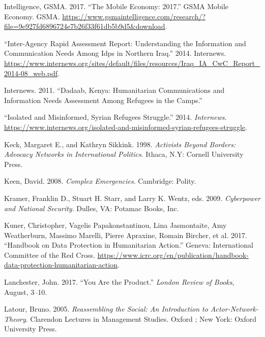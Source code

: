 \begin{cslreferences}
\leavevmode\hypertarget{ref-GSMAIntelligence2017Mobile}{}%
Intelligence, GSMA. 2017. ``The Mobile Economy: 2017.'' GSMA Mobile
Economy. GSMA.
\url{https://www.gsmaintelligence.com/research/?file=9e927fd6896724e7b26f33f61db5b9d5\&download}.

\leavevmode\hypertarget{ref-2014Inter-Agency}{}%
``Inter-Agency Rapid Assessment Report: Understanding the Information
and Communication Needs Among Idps in Northern Iraq.'' 2014. Internews.
\url{https://www.internews.org/sites/default/files/resources/Iraq_IA_CwC_Report_2014-08_web.pdf}.

\leavevmode\hypertarget{ref-Internews2011Dadaab}{}%
Internews. 2011. ``Dadaab, Kenya: Humanitarian Communications and
Information Needs Assessment Among Refugees in the Camps.''

\leavevmode\hypertarget{ref-2014Isolated}{}%
``Isolated and Misinformed, Syrian Refugees Struggle.'' 2014.
\emph{Internews}.
\url{https://www.internews.org/isolated-and-misinformed-syrian-refugees-struggle}.

\leavevmode\hypertarget{ref-Keck1998Activists}{}%
Keck, Margaret E., and Kathryn Sikkink. 1998. \emph{Activists Beyond
Borders: Advocacy Networks in International Politics}. Ithaca, N.Y:
Cornell University Press.

\leavevmode\hypertarget{ref-Keen2008Complex}{}%
Keen, David. 2008. \emph{Complex Emergencies}. Cambridge: Polity.

\leavevmode\hypertarget{ref-2009Cyberpower}{}%
Kramer, Franklin D., Stuart H. Starr, and Larry K. Wentz, eds. 2009.
\emph{Cyberpower and National Security}. Dulles, VA: Potamac Books, Inc.

\leavevmode\hypertarget{ref-Kuner2017Handbook}{}%
Kuner, Christopher, Vagelis Papakonstantinou, Lina Jasmontaite, Amy
Weatherburn, Massimo Marelli, Pierre Apraxine, Romain Bircher, et al.
2017. ``Handbook on Data Protection in Humanitarian Action.'' Geneva:
International Committee of the Red Cross.
\url{https://www.icrc.org/en/publication/handbook-data-protection-humanitarian-action}.

\leavevmode\hypertarget{ref-Lanchester2017You}{}%
Lanchester, John. 2017. ``You Are the Product.'' \emph{London Review of
Books}, August, 3--10.

\leavevmode\hypertarget{ref-Latour2005Reassembling}{}%
Latour, Bruno. 2005. \emph{Reassembling the Social: An Introduction to
Actor-Network-Theory}. Clarendon Lectures in Management Studies. Oxford
; New York: Oxford University Press.


\end{cslreferences}
